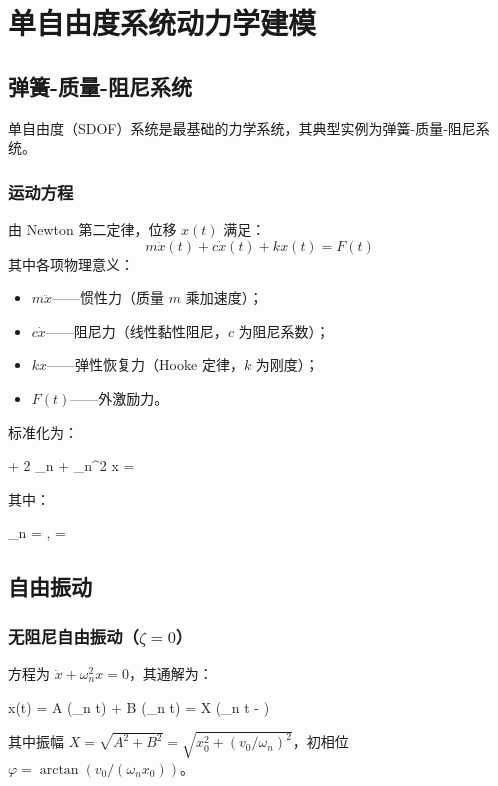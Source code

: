\chapter{单自由度系统动力学建模}


\section{弹簧-质量-阻尼系统}

单自由度（SDOF）系统是最基础的力学系统，其典型实例为弹簧-质量-阻尼系统。

\subsection{运动方程}

由 Newton 第二定律，位移 $x(t)$ 满足：
\[
m \ddot{x}(t) + c \dot{x}(t) + k x(t) = F(t)
\]
其中各项物理意义：
\begin{itemize}
	\item $m \ddot{x}$——惯性力（质量 $m$ 乘加速度）；
	\item $c \dot{x}$——阻尼力（线性黏性阻尼，$c$ 为阻尼系数）；
	\item $k x$——弹性恢复力（Hooke 定律，$k$ 为刚度）；
	\item $F(t)$——外激励力。
\end{itemize}

标准化为：
\begin{myformula}
	 + 2 \zeta \omega_n  + \omega_n^2 x = 
\end{myformula}
其中：
\begin{myformula}
	\omega_n =  \quad {}, \qquad
	\zeta =  \quad {}
\end{myformula}

\section{自由振动}

\subsection{无阻尼自由振动（$\zeta = 0$）}

方程为 $\ddot{x} + \omega_n^2 x = 0$，其通解为：
\begin{myformula}
	x(t) = A \cos(\omega_n t) + B \sin(\omega_n t) = X \cos(\omega_n t - \varphi)
\end{myformula}
其中振幅 $X = \sqrt{A^2 + B^2} = \sqrt{x_0^2 + (v_0/\omega_n)^2}$，初相位 $\varphi = \arctan(v_0/(\omega_n x_0))$。

